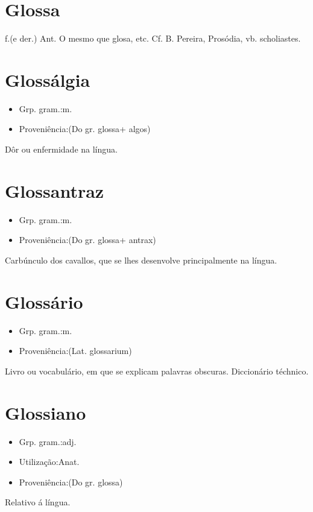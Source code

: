\section{Glossa}
\textunderscore f.\textunderscore  (e der.) \textunderscore Ant.\textunderscore 
O mesmo que \textunderscore glosa\textunderscore , etc. Cf. B. Pereira, \textunderscore Prosódia\textunderscore , vb. \textunderscore scholiastes\textunderscore .
\section{Glossálgia}
\begin{itemize}
\item {Grp. gram.:m.}
\end{itemize}
\begin{itemize}
\item {Proveniência:(Do gr. \textunderscore glossa\textunderscore  + \textunderscore algos\textunderscore )}
\end{itemize}
Dôr ou enfermidade na língua.
\section{Glossantraz}
\begin{itemize}
\item {Grp. gram.:m.}
\end{itemize}
\begin{itemize}
\item {Proveniência:(Do gr. \textunderscore glossa\textunderscore  + \textunderscore antrax\textunderscore )}
\end{itemize}
Carbúnculo dos cavallos, que se lhes desenvolve principalmente na língua.
\section{Glossário}
\begin{itemize}
\item {Grp. gram.:m.}
\end{itemize}
\begin{itemize}
\item {Proveniência:(Lat. \textunderscore glossarium\textunderscore )}
\end{itemize}
Livro ou vocabulário, em que se explicam palavras obscuras.
Diccionário téchnico.
\section{Glossiano}
\begin{itemize}
\item {Grp. gram.:adj.}
\end{itemize}
\begin{itemize}
\item {Utilização:Anat.}
\end{itemize}
\begin{itemize}
\item {Proveniência:(Do gr. \textunderscore glossa\textunderscore )}
\end{itemize}
Relativo á língua.
